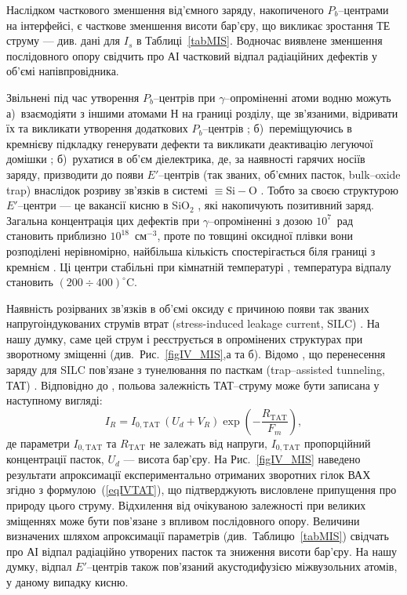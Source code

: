 Наслідком часткового зменшення від'ємного заряду, накопиченого $P_b$--центрами на інтерфейсі, є часткове зменшення висоти бар'єру, що викликає зростання ТЕ струму --- див. дані для $I_s$ в Таблиці~\ref{tabMIS}.
Водночас виявлене зменшення послідовного опору свідчить про АІ частковий відпал радіаційних дефектів у об'ємі напівпровідника.

Звільнені під час утворення $P_b$--центрів при $\gamma$--опроміненні атоми водню можуть
а)~взаємодіяти з іншими атомами Н на границі розділу, ще зв'язаними, відривати їх та викликати утворення додаткових $P_b$--центрів \cite{SiO2:Devine};
б)~переміщуючись в кремнієву підкладку генерувати дефекти та викликати деактивацію легуючої домішки \cite{SiO2:DiMaria};
б)~рухатися в об'єм діелектрика, де, за наявності гарячих носіїв заряду, призводити до появи $E'$--центрів (так званих, об'ємних пасток, bulk--oxide trap) внаслідок розриву зв'язків в системі $\equiv\!\text{Si}\!-\!\text{O}$ \cite{SiO2:Mahapatra,SiO2:Esseni}.
Тобто за своєю структурою $E'$--центри --- це вакансії кисню в SiO$_2$ \cite{SiO2:Takakura,SiO2:Devine},
які накопичують позитивний заряд.
Загальна концентрація цих дефектів при $\gamma$--опроміненні з дозою $10^{7}$~рад становить приблизно $10^{18}$~см$^{-3}$, проте по товщині оксидної плівки вони розподілені нерівномірно, найбільша кількість спостерігається біля границі з кремнієм \cite{PersenkovBook}.
Ці центри стабільні при кімнатній температурі \cite{SiO2:Mahapatra}, температура відпалу становить $(200\div400)^\circ$C.

Наявність розірваних зв'язків в об'ємі оксиду є причиною появи так званих напругоіндукованих струмів втрат (stress-induced leakage current, SILC) \cite{SiO2:Mahapatra,SiO2:DiMaria}.
На нашу думку, саме цей струм і реєструється в опромінених структурах при зворотному зміщенні (див.~Рис.~\ref{figIV_MIS},а та б).
Відомо \cite{SiO2:Esseni,SiO2:DiMaria}, що перенесення заряду для SILC пов'язане з тунелювання по пасткам (trap--assisted tunneling, ТАТ) .
Відповідно до \cite{TAT:Gilmore,TAT:GopalSST,TAT:Gopal}, польова залежність ТАТ--струму може бути записана у наступному вигляді:
\begin{equation}\label{eqIVTAT}
  I_R=I_{0,\mathrm{TAT}}\,(U_d+V_R)\exp\left(-\frac{R_\mathrm{TAT}}{F_m}\right),
\end{equation}
де
параметри $I_{0,\mathrm{TAT}}$ та $R_\mathrm{TAT}$ не залежать від напруги,
$I_{0,\mathrm{TAT}}$ пропорційний концентрації пасток,
$U_d$ --- висота бар'єру.
На Рис.~\ref{figIV_MIS} наведено результати апроксимації експериментально отриманих зворотних гілок ВАХ згідно з формулою~(\ref{eqIVTAT}), що підтверджують висловлене припущення про природу цього струму.
Відхилення від очікуваною залежності при великих зміщеннях може бути пов'язане з впливом послідовного опору.
Величини визначених шляхом апроксимації параметрів (див.~Таблицю~\ref{tabMIS}) свідчать про АІ відпал радіаційно утворених пасток та зниження висоти бар'єру.
На нашу думку, відпал $E'$--центрів також пов'язаний акустодифузією міжвузольних атомів, у даному випадку  кисню.

